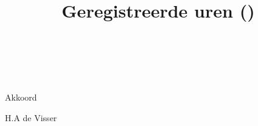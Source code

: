 \documentclass{memoir}
\title{Geregistreerde uren (\aboutmonth)}
\author{
  \b {\fromname \\
      \fromaddress \\
  \ordernumber}
}
\begin{document}
  \maketitle

  \urentable

  \vspace{1cm}

  Akkoord

  \vspace*{1.5cm}

  H.A de Visser
\end{document}
